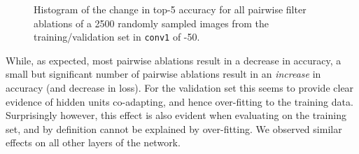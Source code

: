 \documentclass[thesis]{subfiles}
\begin{document}
\begin{figure}[tbp]
%
\caption[Pairwise filter ablations in ResNet 50]{Histogram of the change in top-5 accuracy for all pairwise filter ablations of a 2500 randomly sampled images from the  training/validation set in \texttt{conv1} of -50.}
\label{fig:resnet50ablation_conv1_top5}
\end{figure}

While, as expected, most pairwise ablations result in a decrease in accuracy, a small but significant number of pairwise ablations result in an \emph{increase} in accuracy (and decrease in loss). For the validation set this seems to provide clear evidence of hidden units co-adapting, and hence over-fitting to the training data. Surprisingly however, this effect is also evident when evaluating on the training set, and by definition cannot be explained by over-fitting. We observed similar effects on all other layers of the network.
\end{document}
